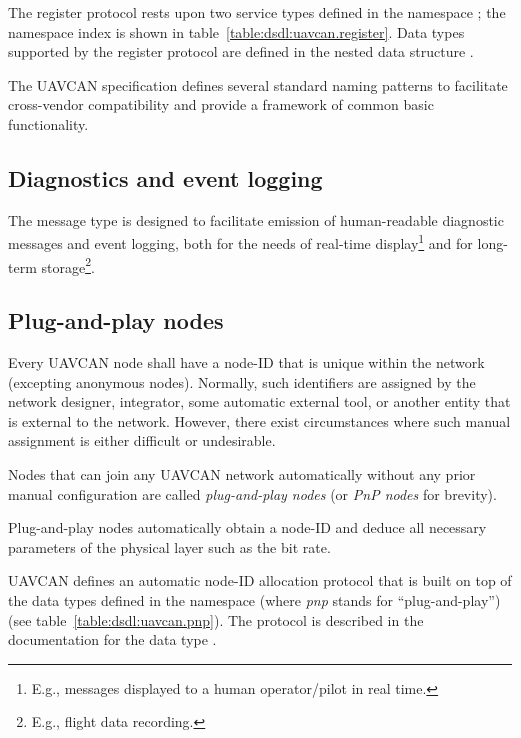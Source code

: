 The register protocol rests upon two service types defined in the namespace ;
the namespace index is shown in table~\ref{table:dsdl:uavcan.register}.
Data types supported by the register protocol are defined in the nested data structure
.

The UAVCAN specification defines several standard naming patterns to facilitate cross-vendor compatibility
and provide a framework of common basic functionality.


\subsection{Diagnostics and event logging}

The message type  is designed to facilitate emission of
human-readable diagnostic messages and event logging,
both for the needs of real-time display\footnote{E.g., messages displayed to a human operator/pilot in real time.}
and for long-term storage\footnote{E.g., flight data recording.}.

\subsection{Plug-and-play nodes}\label{sec:application_functions_pnp}

Every UAVCAN node shall have a node-ID that is unique within the network (excepting anonymous nodes).
Normally, such identifiers are assigned by the network designer, integrator, some automatic external tool,
or another entity that is external to the network.
However, there exist circumstances where such manual assignment is either difficult or undesirable.

Nodes that can join any UAVCAN network automatically without any prior manual configuration
are called \emph{plug-and-play nodes} (or \emph{PnP nodes} for brevity).

Plug-and-play nodes automatically obtain a node-ID and deduce all necessary parameters of the physical layer
such as the bit rate.

UAVCAN defines an automatic node-ID allocation protocol that is built on top of the data types defined in the
namespace  (where \emph{pnp} stands for ``plug-and-play'')
(see table~\ref{table:dsdl:uavcan.pnp}).
The protocol is described in the documentation for the data type .


